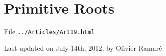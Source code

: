 \chapter{  Primitive Roots}

File \texttt{../Articles/Art19.html}










 
 







  
  Last updated on July 14th, 2012, by Olivier Ramar\'e















